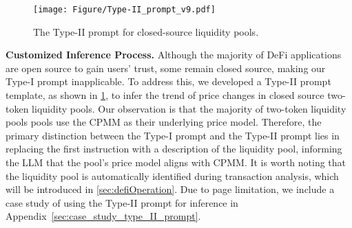 
\begin{figure}[!t]
    \centering
    \texttt{[image: Figure/Type-II\_prompt\_v9.pdf]}
    \vspace{-1ex}
    \caption{The Type-II prompt for closed-source liquidity pools.}
    \label{fig:type-II_prompt}
\end{figure}

\noindent
\textbf{Customized Inference Process.}
Although the majority of DeFi applications are open source to gain users' trust, some remain closed source, making our Type-I prompt inapplicable.
To address this, we developed a Type-II prompt template, as shown in \myfig\ref{fig:type-II_prompt}, to infer the trend of price changes in closed source two-token liquidity pools.
Our observation is that the majority of two-token liquidity pools pools use the CPMM as their underlying price model.
Therefore, the primary distinction between the Type-I prompt and the Type-II prompt lies in replacing the first instruction with a description of the liquidity pool, informing the LLM that the pool's price model aligns with CPMM.
It is worth noting that the liquidity pool is automatically identified during transaction analysis, which will be introduced in \mysec\ref{sec:defiOperation}.
Due to page limitation, we include a case study of using the Type-II prompt for inference in Appendix~\ref{sec:case_study_type_II_prompt}.




